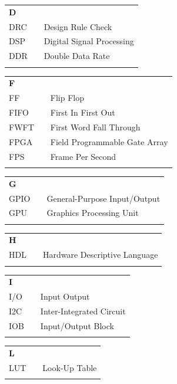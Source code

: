 \documentclass{jtetiskripsi}
\begin{document}
\begin{tabular}{p{20pt}p{3pt}l}
\textbf{D}\\
DRC & & Design Rule Check\\
DSP & & Digital Signal Processing\\
DDR & & Double Data Rate\\
\\
\end{tabular}

\begin{tabular}{p{20pt}p{3pt}l}
\textbf{F}\\
FF & & Flip Flop\\
FIFO & & First In First Out\\
FWFT & & First Word Fall Through\\
FPGA & & Field Programmable Gate Array\\
FPS & & Frame Per Second\\
\\
\end{tabular}

\begin{tabular}{p{20pt}p{3pt}l}
\textbf{G}\\
GPIO & & General-Purpose Input/Output\\
GPU & & Graphics Processing Unit\\
\\
\end{tabular}

\begin{tabular}{p{20pt}p{3pt}l}
\textbf{H}\\
HDL & & Hardware Descriptive Language\\
\\
\end{tabular}

\begin{tabular}{p{20pt}p{3pt}l}
\textbf{I}\\
I/O & & Input Output\\
I2C & & Inter-Integrated Circuit\\
IOB & & Input/Output Block\\
\\
\end{tabular}

\begin{tabular}{p{20pt}p{3pt}l}
\textbf{L}\\
LUT & & Look-Up Table\\
\\
\end{tabular}
\end{document}
